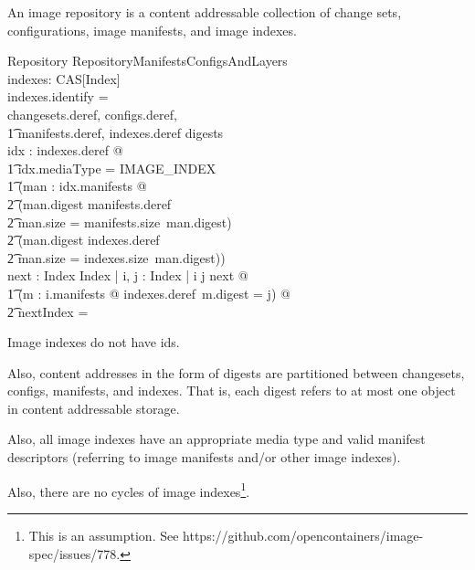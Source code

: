 \documentclass[a4paper,twoside,12pt]{article}
\begin{document}
An image repository is a content addressable collection of change sets, configurations, image manifests, and image indexes.
\begin{schema}{Repository}
  RepositoryManifestsConfigsAndLayers \\
  indexes: CAS[Index] \\
\where
  indexes.identify = \emptyset \\
\also
  \langle \dom changesets.deref, \dom configs.deref, \\
  \t1 \dom manifests.deref, \dom indexes.deref  \rangle \partition digests \\
\also
  \forall idx : \ran indexes.deref @ \\
  \t1 idx.mediaType = IMAGE\_INDEX \land \\
  \t1 (\forall man : \ran idx.manifests @ \\
    \t2 (man.digest \in \dom manifests.deref \land \\
    \t2 man.size = manifests.size~man.digest) \lor \\
    \t2 (man.digest \in \dom indexes.deref \land \\
    \t2 man.size = indexes.size~man.digest)) \\
\also
  \exists next : Index \rel Index | \forall i, j : Index | i \mapsto j \in next @ \\
  \t1 (\exists m : \ran i.manifests @ indexes.deref~m.digest = j) @ \\
  \t2 next\plus \cap \id Index = \emptyset \\
\end{schema}
Image indexes do not have ids.

Also, content addresses in the form of digests are partitioned between changesets, configs, manifests, and indexes.
That is, each digest refers to at most one object in content addressable storage.

Also, all image indexes have an appropriate media type and valid manifest descriptors (referring to image manifests and/or other image indexes).

Also, there are no cycles of image indexes\footnote{This is an assumption. See https://github.com/opencontainers/image-spec/issues/778.}.


\clearpage

\appendix
\end{document}
